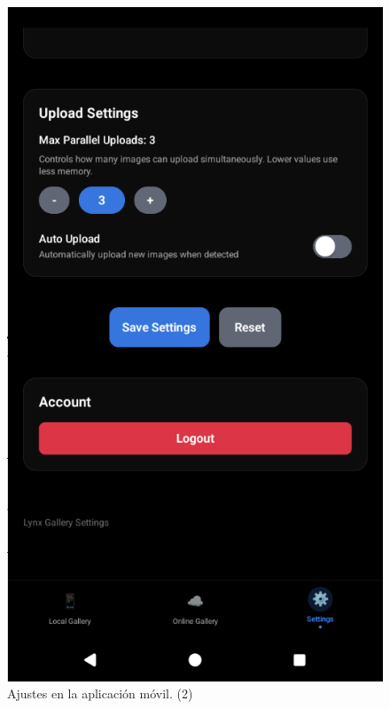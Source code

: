 \begin{figure}[H]
\begin{minipage}[t]{0.3\textwidth}
    \includegraphics[width=\textwidth]{assets/settings-mobile2.png}
    \caption{Ajustes en la aplicación móvil. (2)}
    \label{fig:settings-mobile2}
  \end{minipage}
\end{figure}

